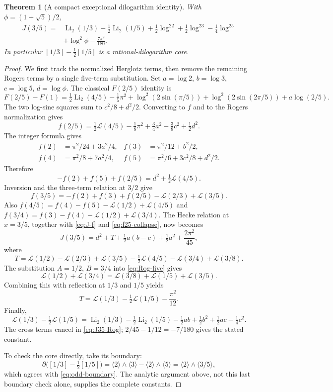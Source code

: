 \documentclass[11pt]{article}
\numberwithin{equation}{section}
\newtheorem{theorem}{Theorem}[section]
\theoremstyle{definition}
\theoremstyle{remark}
\newcommand{\Rog}{\mathcal L}
\newcommand{\cl}[1]{\langle #1\rangle}
\DeclareMathOperator{\Li}{Li}
\begin{document}
\begin{theorem}[A compact exceptional dilogarithm identity]\label{thm:J35}
With $\phi=(1+\sqrt5)/2$,
\begin{equation}\label{eq:J35}
 \boxed{\begin{aligned}
 J(3/5)={}&\Li_2(1/3)-\frac12\Li_2(1/5)
  +\frac12\log^22+\frac12\log^23-\frac14\log^25\\
 &+\log^2\phi-\frac{7\pi^2}{180}.
 \end{aligned}}
\end{equation}
In particular $[1/3]-\tfrac12[1/5]$ is a rational-dilogarithm core.
\end{theorem}
\begin{proof}
We first track the normalized Herglotz terms, then remove the remaining
Rogers terms by a single five-term substitution. Set
$a=\log2$, $b=\log3$, $c=\log5$, $d=\log\phi$.
The classical $F(2/5)$ identity \cite[(24)]{RZ} is
\[
 F(2/5)-F(1)=\tfrac12\Li_2(4/5)-\tfrac15\pi^2
 +\log^2(2\sin(\pi/5))+\log^2(2\sin(2\pi/5))
 +a\log(2/5).
\]
The two log-sine squares sum to $c^2/8+d^2/2$. Converting to $f$ and
to the Rogers normalization gives
\begin{equation}\label{eq:f25}
 f(2/5)=\tfrac12\Rog(4/5)-\tfrac18\pi^2
                      +\tfrac34a^2-\tfrac38c^2+\tfrac12d^2.
\end{equation}
The integer formula gives
\begin{align*}
 f(2)&=\pi^2/24+3a^2/4,&
 f(3)&=\pi^2/12+b^2/2,\\
 f(4)&=\pi^2/8+7a^2/4,&
 f(5)&=\pi^2/6+3c^2/8+d^2/2.
\end{align*}
Therefore
\begin{equation}\label{eq:f25-collapse}
 -f(2)+f(5)+f(2/5)=d^2+\tfrac12\Rog(4/5).
\end{equation}
Inversion and the three-term relation at $3/2$ give
\[
 f(3/5)=-f(2)+f(3)+f(2/5)-\Rog(2/3)+\Rog(3/5).
\]
Also
$f(4/5)=f(4)-f(5)-\Rog(1/2)+\Rog(4/5)$ and
$f(3/4)=f(3)-f(4)-\Rog(1/2)+\Rog(3/4)$.
The Hecke relation at $x=3/5$, together with
\eqref{eq:J-f} and \eqref{eq:f25-collapse}, now becomes
\begin{equation}\label{eq:J35-Rog}
 J(3/5)=d^2+T+\tfrac12a(b-c)+\tfrac12a^2+\frac{2\pi^2}{45},
\end{equation}
where
\[
 T=\Rog(1/2)-\Rog(2/3)+\Rog(3/5)-\tfrac12\Rog(4/5)
                         -\Rog(3/4)+\Rog(3/8).
\]
The substitution $A=1/2$, $B=3/4$ into \eqref{eq:Rog-five} gives
\[
 \Rog(1/2)+\Rog(3/4)=\Rog(3/8)+\Rog(1/5)+\Rog(3/5).
\]
Combining this with reflection at $1/3$ and $1/5$ yields
\[
 T=\Rog(1/3)-\tfrac12\Rog(1/5)-\frac{\pi^2}{12}.
\]
Finally,
\[
 \Rog(1/3)-\tfrac12\Rog(1/5)
 =\Li_2(1/3)-\tfrac12\Li_2(1/5)
  -\tfrac12ab+\tfrac12b^2+\tfrac12ac-\tfrac14c^2.
\]
The cross terms cancel in \eqref{eq:J35-Rog};
$2/45-1/12=-7/180$ gives the stated constant.

To check the core directly, take its boundary:
\[
 \partial\bigl([1/3]-\tfrac12[1/5]\bigr)
 =\cl2\wedge\cl3-\cl2\wedge\cl5
 =\cl2\wedge\cl{3/5},
\]
which agrees with \eqref{eq:odd-boundary}. The analytic argument above,
not this last boundary check alone, supplies the complete constants.
\end{proof}
\end{document}
